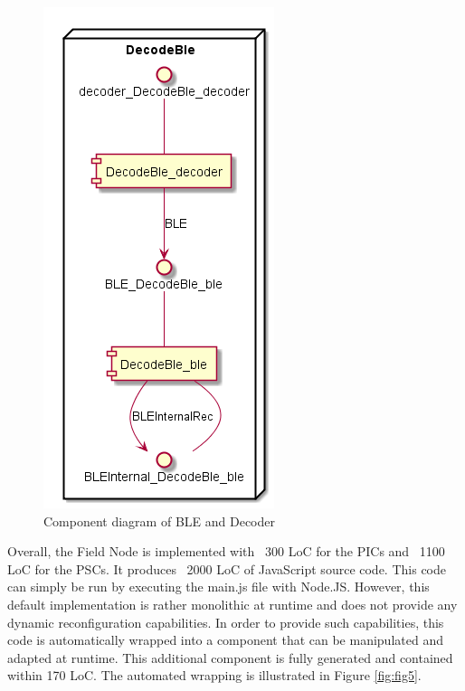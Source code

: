 \begin{figure}[t]
	\centering
	\includegraphics[width=0.5\linewidth]{figures/fig4}
	\caption{Component diagram of BLE and Decoder}
	\label{fig:fig4}
\end{figure}

Overall, the Field Node is implemented with ~300 LoC for the PICs and ~1100 LoC for the PSCs. It produces ~2000 LoC of JavaScript source code. This code can simply be run by executing the main.js file with Node.JS. However, this default implementation is rather monolithic at runtime and does not provide any dynamic reconfiguration capabilities. In order to provide such capabilities, this code is automatically wrapped into a component that can be manipulated and adapted at runtime. This additional component is fully generated and contained within 170 LoC. The automated wrapping is illustrated in Figure \ref{fig:fig5}. 

